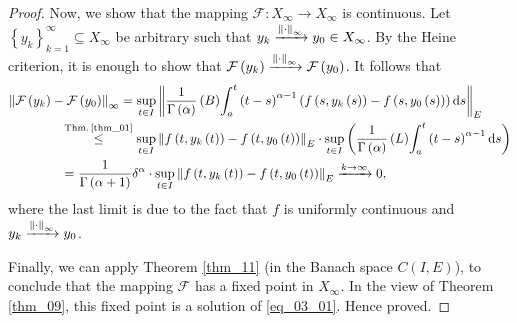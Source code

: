\documentclass[reqno]{amsart}
\numberwithin{equation}{section}
\theoremstyle{definition}
\theoremstyle{remark}
\newcommand{\Bint}[3]{\br{B}\!\displaystyle\int_{#1}^{#2}{#3}}
\newcommand{\br}[1]{\left(#1\right)}
\newcommand{\C}[2]{C\br{#1,#2}}
\newcommand{\cbr}[1]{\left\{#1\right\}}
\newcommand{\ds}{\mathrm{d}s}
\newcommand{\fF}{\mathcal{F}}
\newcommand{\leqText}[1]{\stackrel{#1}{\leq}}
\newcommand{\Lint}[3]{\br{L}\!\displaystyle\int_{#1}^{#2}{#3}}
\newcommand{\st}{\!:}
\newcommand{\theoremRef}[1]{\textrm{Theorem \ref{#1}}}
\newcommand{\thmRef}[1]{\textrm{Thm.\,\ref{#1}}}
\begin{document}
\begin{proof}
	Now, we show that the mapping $\fF\st{X}_{\infty}\rightarrow{X}_{\infty}$ is continuous. Let $\cbr{y_k}_{k=1}^{\infty}\subseteq{X}_{\infty}$ be arbitrary such that $y_k\xrightarrow{\norm{\cdot}_{\infty}}y_0\in{X}_{\infty}$. By the Heine criterion, it is enough to show that $\fF\br{y_k}\xrightarrow{\norm{\cdot}_{\infty}}\fF\br{y_0}$. It follows that
	\begin{equation*}
		\begin{aligned}
			&\norm{\fF\br{y_k}-\fF\br{y_0}}_{\infty}=\sup_{t\in{I}}\norm{\frac{1}{\Gamma\br{\alpha}}\Bint{a}{t}{\br{t-s}^{\alpha-1}\br{f\br{s,y_k\br{s}}-f\br{s,y_0\br{s}}}\ds}}_E\\
			&\qquad\qquad\leqText{\thmRef{thm_01}}\sup_{t\in{I}}\norm{f\br{t,y_k\br{t}}-f\br{t,y_0\br{t}}}_E\cdot\sup_{t\in{I}}\br{\frac{1}{\Gamma\br{\alpha}}\Lint{a}{t}{\br{t-s}^{\alpha-1}\ds}}\\
			&\qquad\qquad=\frac{1}{\Gamma\br{\alpha+1}}\delta^{\alpha}\cdot\sup_{t\in{I}}\norm{f\br{t,y_k\br{t}}-f\br{t,y_0\br{t}}}_E\xrightarrow{k\rightarrow\infty}0,
		\end{aligned}
	\end{equation*}
	where the last limit is due to the fact that $f$ is uniformly continuous and $y_k\xrightarrow{\norm{\cdot}_{\infty}}y_0$.
	
	Finally, we can apply \theoremRef{thm_11} (in the Banach space $\C{I}{E}$), to conclude that the mapping $\fF$ has a fixed point in $X_{\infty}$. In the view of \theoremRef{thm_09}, this fixed point is a solution of \eqref{eq_03_01}. Hence proved.
	\end{proof}
	
\end{document}
